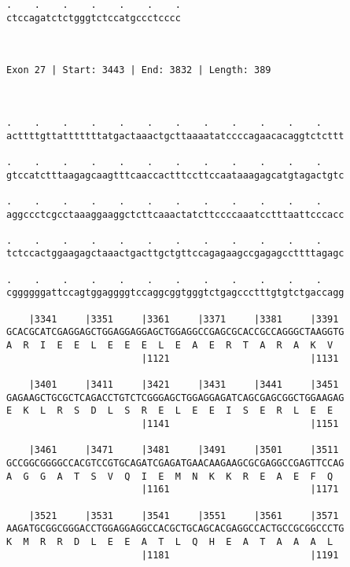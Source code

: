 \documentclass{article}
\begin{document}
\begin{Verbatim}
.    .    .    .    .    .    .
ctccagatctctgggtctccatgccctcccc
                               
                               
 
Exon 27 | Start: 3443 | End: 3832 | Length: 389



.    .    .    .    .    .    .    .    .    .    .    .    
acttttgttatttttttatgactaaactgcttaaaatatccccagaacacaggtctcttt
                                                            
.    .    .    .    .    .    .    .    .    .    .    .    
gtccatctttaagagcaagtttcaaccactttccttccaataaagagcatgtagactgtc
                                                            
.    .    .    .    .    .    .    .    .    .    .    .    
aggccctcgcctaaaggaaggctcttcaaactatcttccccaaatcctttaattcccacc
                                                            
.    .    .    .    .    .    .    .    .    .    .    .    
tctccactggaagagctaaactgacttgctgttccagagaagccgagagccttttagagc
                                                            
.    .    .    .    .    .    .    .    .    .    .    .    
cggggggattccagtggaggggtccaggcggtgggtctgagccctttgtgtctgaccagg
                                                            
    |3341     |3351     |3361     |3371     |3381     |3391 
GCACGCATCGAGGAGCTGGAGGAGGAGCTGGAGGCCGAGCGCACCGCCAGGGCTAAGGTG
A  R  I  E  E  L  E  E  E  L  E  A  E  R  T  A  R  A  K  V  
                        |1121                         |1131 
  
    |3401     |3411     |3421     |3431     |3441     |3451 
GAGAAGCTGCGCTCAGACCTGTCTCGGGAGCTGGAGGAGATCAGCGAGCGGCTGGAAGAG
E  K  L  R  S  D  L  S  R  E  L  E  E  I  S  E  R  L  E  E  
                        |1141                         |1151 
  
    |3461     |3471     |3481     |3491     |3501     |3511 
GCCGGCGGGGCCACGTCCGTGCAGATCGAGATGAACAAGAAGCGCGAGGCCGAGTTCCAG
A  G  G  A  T  S  V  Q  I  E  M  N  K  K  R  E  A  E  F  Q  
                        |1161                         |1171 
  
    |3521     |3531     |3541     |3551     |3561     |3571 
AAGATGCGGCGGGACCTGGAGGAGGCCACGCTGCAGCACGAGGCCACTGCCGCGGCCCTG
K  M  R  R  D  L  E  E  A  T  L  Q  H  E  A  T  A  A  A  L  
                        |1181                         |1191 
  

\end{Verbatim}
\end{document}
